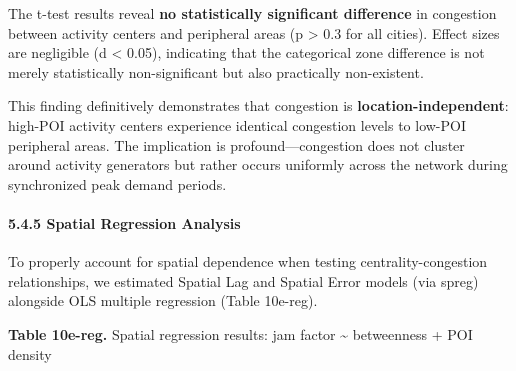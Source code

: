The t-test results reveal \textbf{no statistically significant difference} in congestion between activity centers and peripheral areas (p \textgreater{} 0.3 for all cities). Effect sizes are negligible (\textbar d\textbar{} \textless{} 0.05), indicating that the categorical zone difference is not merely statistically non-significant but also practically non-existent.

This finding definitively demonstrates that congestion is \textbf{location-independent}: high-POI activity centers experience identical congestion levels to low-POI peripheral areas. The implication is profound---congestion does not cluster around activity generators but rather occurs uniformly across the network during synchronized peak demand periods.

\paragraph{5.4.5 Spatial Regression Analysis}\label{spatial-regression-analysis}

To properly account for spatial dependence when testing centrality-congestion relationships, we estimated Spatial Lag and Spatial Error models (via spreg) alongside OLS multiple regression (Table 10e-reg).

\textbf{Table 10e-reg.} Spatial regression results: jam factor \textasciitilde{} betweenness + POI density

